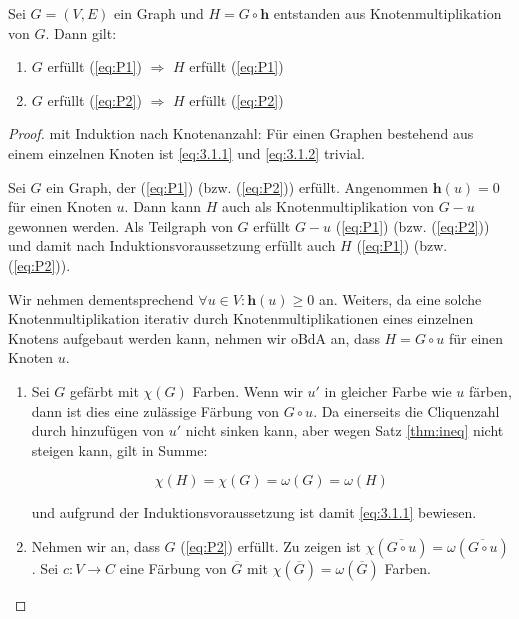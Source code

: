 \documentclass[../main.tex]{subfiles}
\begin{document}
\begin{satz}\label{thm:lemma3.1}
    Sei $G = (V, E)$ ein Graph und $H = G \circ \mathbf h$ entstanden aus Knotenmultiplikation von $G$. Dann gilt:
    \begin{enumerate}[label=(\roman*)]
        \item $G$ erfüllt (\ref{eq:P1}) $\Rightarrow$ $H$ erfüllt (\ref{eq:P1})\label{eq:3.1.1}
        \item $G$ erfüllt (\ref{eq:P2}) $\Rightarrow$ $H$ erfüllt (\ref{eq:P2})\label{eq:3.1.2}
    \end{enumerate}
\end{satz}
\begin{proof}
    mit Induktion nach Knotenanzahl: Für einen Graphen bestehend aus einem einzelnen Knoten ist \ref{eq:3.1.1} und \ref{eq:3.1.2} trivial.

    Sei $G$ ein Graph, der (\ref{eq:P1}) (bzw. (\ref{eq:P2})) erfüllt. Angenommen $\mathbf h(u) = 0$ für einen Knoten $u$. Dann kann $H$ auch als Knotenmultiplikation von $G - u$ gewonnen werden. Als Teilgraph von $G$ erfüllt $G - u$ (\ref{eq:P1}) (bzw. (\ref{eq:P2})) und damit nach Induktionsvoraussetzung erfüllt auch $H$ (\ref{eq:P1}) (bzw. (\ref{eq:P2})).

    Wir nehmen dementsprechend $\forall u \in V : \mathbf h(u) \geq 0$ an. Weiters, da eine solche Knotenmultiplikation iterativ durch Knotenmultiplikationen eines einzelnen Knotens aufgebaut werden kann, nehmen wir oBdA an, dass $H = G \circ u$ für einen Knoten $u$.

    \begin{enumerate}[label=(\roman*)]
        \item Sei $G$ gefärbt mit $\chi(G)$ Farben. Wenn wir $u'$ in gleicher Farbe wie $u$ färben, dann ist dies eine zulässige Färbung von $G \circ u$. Da einerseits die Cliquenzahl durch hinzufügen von $u'$ nicht sinken kann, aber wegen Satz \ref{thm:ineq} nicht steigen kann, gilt in Summe:
        
        \begin{equation*}
            \chi(H) = \chi(G) = \omega(G) = \omega(H)
        \end{equation*}
        
        und aufgrund der Induktionsvoraussetzung ist damit \ref{eq:3.1.1} bewiesen.
        
        \item Nehmen wir an, dass $G$ (\ref{eq:P2}) erfüllt. Zu zeigen ist $\chi(\overline{G \circ u}) = \omega(\overline{G \circ u})$. Sei $c : V \to C$ eine Färbung von $\overline G$ mit $\chi(\overline G) = \omega(\overline G)$ Farben. 
        

\end{enumerate}
\end{proof}
\end{document}
